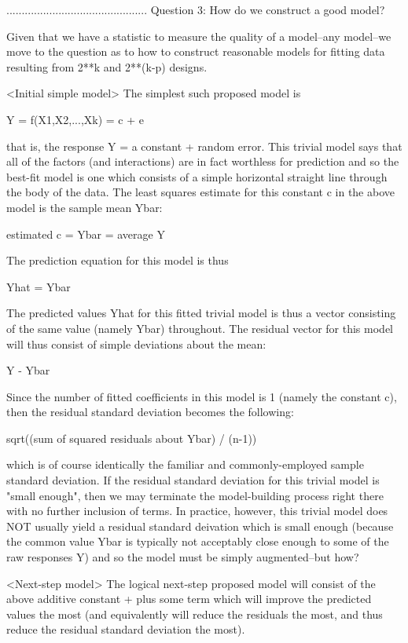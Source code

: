 ..............................................
Question 3: How do we construct a good model?

Given that we have a statistic to measure the
quality of a model--any model--we move to the
question as to how to construct reasonable models
for fitting data resulting from 2**k and 2**(k-p)
designs.

<Initial simple model>
The simplest such proposed model is

   Y = f(X1,X2,...,Xk) = c + e

that is, the response Y = a constant + random
error.  This trivial model says that all of the
factors (and interactions) are in fact worthless
for prediction and so the best-fit model is one
which consists of a simple horizontal straight
line through the body of the data.  The least
squares estimate for this constant c in the above
model is the sample mean Ybar:

   estimated c = Ybar = average Y

The prediction equation for this model is thus

   Yhat = Ybar

The predicted values Yhat for this fitted trivial
model is thus a vector consisting of the same
value (namely Ybar) throughout.  The residual
vector for this model will thus consist of simple
deviations about the mean:

   Y - Ybar

Since the number of fitted coefficients in this
model is 1 (namely the constant c), then the
residual standard deviation becomes the following:

   sqrt((sum of squared residuals about Ybar) / (n-1))

which is of course identically the familiar and
commonly-employed sample standard deviation.  If
the residual standard deviation for this trivial
model is "small enough", then we may terminate the
model-building process right there with no further
inclusion of terms.  In practice, however, this
trivial model does NOT usually yield a residual
standard deivation which is small enough (because
the common value Ybar is typically not acceptably
close enough to some of the raw responses Y) and
so the model must be simply augmented--but how?

<Next-step model>
The logical next-step proposed model will consist
of the above additive constant + plus some term
which will improve the predicted values the most
(and equivalently will reduce the residuals the
most, and thus reduce the residual standard
deviation the most).

